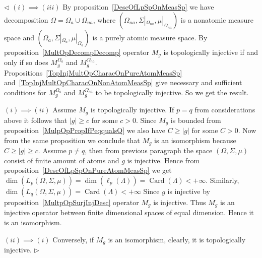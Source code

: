 \documentclass[12pt]{article}
\newenvironment{proof}{\par $\triangleleft$}{$\triangleright$}
\begin{document}
\begin{proof} $(i)\implies (iii)$
    By proposition~\ref{DescOfLpSpOnMeasSp} we have decomposition
    $\Omega=\Omega_{a}\cup\Omega_{na}$, where
    $(\Omega_{na},\Sigma|_{\Omega_{na}},\mu|_{\Omega_{na}})$ is a nonatomic
    measure space and $(\Omega_{a},\Sigma|_{\Omega_{a}},\mu|_{\Omega_{a}})$ is
    a purely atomic measure space. By proposition~\ref{MultOpDecompDecomp}
    operator $M_g$ is topologically injective if and only if so does
    $M_g^{\Omega_{a}}$ and $M_g^{\Omega_{na}}$.
    Propositions~\ref{TopInjMultOpCharacOnPureAtomMeasSp}
    and~\ref{TopInjMultOpCharacOnNonAtomMeasSp} give necessary and sufficient
    conditions for $M_g^{\Omega_{a}}$ and $M_g^{\Omega_{na}}$ to be
    topologically injective. So we get the result.

    $(i)\implies (ii)$ Assume $M_g$ is topologically injective. If $p=q$
    from considerations above it follows that $|g|\geq c$ for some $c>0$.
    Since $M_g$ is bounded from proposition~\ref{MulpOpPropIfPeqqualsQ} we also
    have $C\geq |g|$ for some $C>0$. Now from the same proposition we conclude
    that $M_g$ is an isomorphism because $C\geq|g|\geq c$. Assume $p\neq q$,
    then from previous paragraph the space $(\Omega,\Sigma,\mu)$ consist of
    finite amount of atoms and $g$ is injective. Hence from
    proposition~\ref{DescOfLpSpOnPureAtomMeasSp} we get
    $\operatorname{dim}(L_p(\Omega,\Sigma,\mu))
        =\operatorname{dim}(\ell_p(\Lambda))
        =\operatorname{Card}(\Lambda)<+\infty$. Similarly,
    $\operatorname{dim}(L_q(\Omega,\Sigma,\mu))
        =\operatorname{Card}(\Lambda)<+\infty$ Since $g$ is injective by
    proposition~\ref{MultpOpSurjInjDesc} operator $M_g$ is injective.
    Thus $M_g$ is an injective operator between finite dimensional spaces of
    equal dimension. Hence it is an isomorphism.

    $(ii)\implies (i)$ Conversely, if $M_g$ is an isomorphism, clearly, it is
    topologically injective.
\end{proof}
\end{document}
